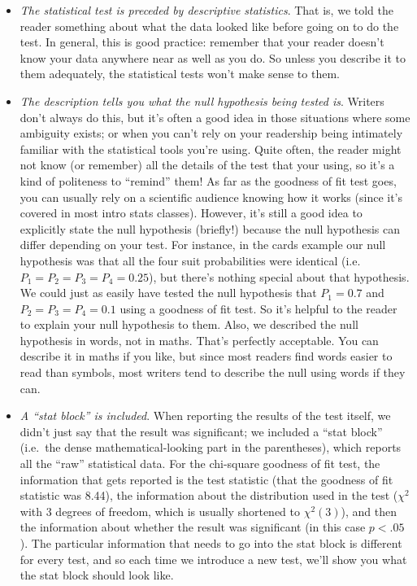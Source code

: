 \documentclass[
  11pt,
  a4paper,
  twoside,symmetric,openright]{book}
\providecommand{\tightlist}{%
  \setlength{\itemsep}{0pt}\setlength{\parskip}{0pt}}
\theoremstyle{break}
\theoremstyle{break}
\begin{document}
\begin{itemize}
\tightlist
\item
  \emph{The statistical test is preceded by descriptive statistics}. That is, we told the reader something about what the data looked like before going on to do the test. In general, this is good practice: remember that your reader doesn't know your data anywhere near as well as you do. So unless you describe it to them adequately, the statistical tests won't make sense to them.
\item
  \emph{The description tells you what the null hypothesis being tested is}. Writers don't always do this, but it's often a good idea in those situations where some ambiguity exists; or when you can't rely on your readership being intimately familiar with the statistical tools you're using. Quite often, the reader might not know (or remember) all the details of the test that your using, so it's a kind of politeness to ``remind'' them! As far as the goodness of fit test goes, you can usually rely on a scientific audience knowing how it works (since it's covered in most intro stats classes). However, it's still a good idea to explicitly state the null hypothesis (briefly!) because the null hypothesis can differ depending on your test. For instance, in the cards example our null hypothesis was that all the four suit probabilities were identical (i.e.~\(P_1 = P_2 = P_3 = P_4 = 0.25\)), but there's nothing special about that hypothesis. We could just as easily have tested the null hypothesis that \(P_1 = 0.7\) and \(P_2 = P_3 = P_4 = 0.1\) using a goodness of fit test. So it's helpful to the reader to explain your null hypothesis to them. Also, we described the null hypothesis in words, not in maths. That's perfectly acceptable. You can describe it in maths if you like, but since most readers find words easier to read than symbols, most writers tend to describe the null using words if they can.
\item
  \emph{A ``stat block'' is included}. When reporting the results of the test itself, we didn't just say that the result was significant; we included a ``stat block'' (i.e.~the dense mathematical-looking part in the parentheses), which reports all the ``raw'' statistical data. For the chi-square goodness of fit test, the information that gets reported is the test statistic (that the goodness of fit statistic was 8.44), the information about the distribution used in the test (\(\chi^2\) with 3 degrees of freedom, which is usually shortened to \(\chi^2(3)\)), and then the information about whether the result was significant (in this case \(p<.05\)). The particular information that needs to go into the stat block is different for every test, and so each time we introduce a new test, we'll show you what the stat block should look like.

\end{itemize}
\end{document}
